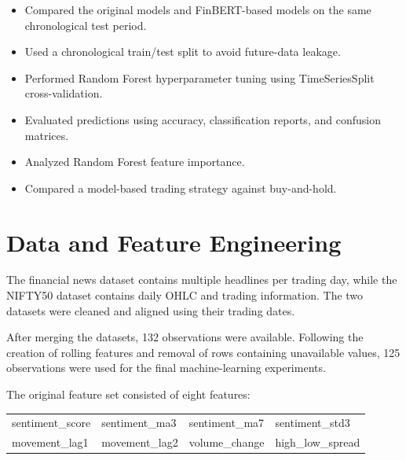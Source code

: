 \documentclass[10pt,a4paper]{article}
\begin{document}
\begin{itemize}[
		leftmargin=*,
		itemsep=1pt,
		topsep=2pt
		]
		\item Compared the original models and FinBERT-based models on the
		same chronological test period.
		
		\item Used a chronological train/test split to avoid future-data
		leakage.
		
		\item Performed Random Forest hyperparameter tuning using
		TimeSeriesSplit cross-validation.
		
		\item Evaluated predictions using accuracy, classification reports,
		and confusion matrices.
		
		\item Analyzed Random Forest feature importance.
		
		\item Compared a model-based trading strategy against buy-and-hold.
		
	\end{itemize}
	
	\section{Data and Feature Engineering}
	
	The financial news dataset contains multiple headlines per trading day,
	while the NIFTY50 dataset contains daily OHLC and trading information.
	The two datasets were cleaned and aligned using their trading dates.
	
	After merging the datasets, 132 observations were available. Following
	the creation of rolling features and removal of rows containing
	unavailable values, 125 observations were used for the final
	machine-learning experiments.
	
	The original feature set consisted of eight features:
	
	\begin{center}
		\small
		\begin{tabular}{>{\ttfamily}llll}
			sentiment\_score &
			sentiment\_ma3 &
			sentiment\_ma7 &
			sentiment\_std3 \\
			
			movement\_lag1 &
			movement\_lag2 &
			volume\_change &
			high\_low\_spread
		\end{tabular}
	\end{center}
	
\end{document}
